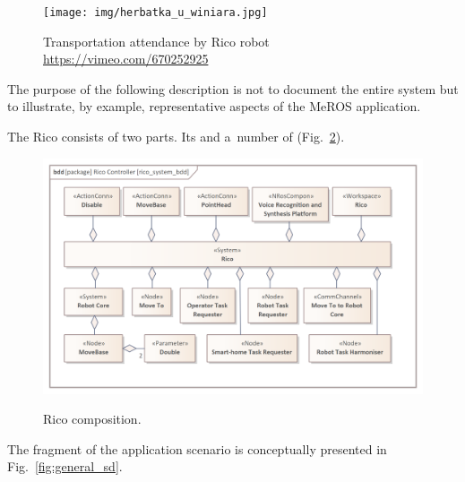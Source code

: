 \documentclass[11pt,oneside,a4paper]{report}
\begin{document}
	\begin{figure}[H]
		\centering
		\begin{center}
			{\texttt{[image: img/herbatka\_u\_winiara.jpg]}}
		\end{center}
		\caption{Transportation attendance by Rico robot \url{https://vimeo.com/670252925}} 
		\label{fig:herbatka_u_winiara}
	\end{figure}
	
	
	
	 The purpose of the following description is not to document the entire system but to illustrate, by example, representative aspects of the MeROS application.
	 
	\newpage
	The Rico \stSystem{} consists of two parts. Its \stWorkspace{} and a~number of \stRunSystemCompon{} (Fig.~\ref{fig:rico_system_bdd}).
	
	
	\begin{figure}[H] 
		\centering
		\begin{center}
			{\includegraphics[scale=.9]{img/rico_pkg/rico_system_bdd.png}}
		\end{center}
		\caption{Rico \stSystem{} composition.} 
		\label{fig:rico_system_bdd}
	\end{figure}
	
	
	The fragment of the application scenario is conceptually presented in Fig.~\ref{fig:general_sd}.
	
\end{document}
